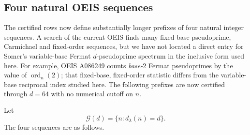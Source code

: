 \documentclass[11pt]{article}
\newcommand{\ord}{\operatorname{ord}}
\begin{document}
\subsection{Four natural OEIS sequences}
\label{subsec:oeis}

The certified rows now define substantially longer prefixes of four natural
integer sequences.  A search of the current OEIS finds many fixed-base
pseudoprime, Carmichael and fixed-order sequences, but we have not located a
direct entry for Somer's variable-base Fermat $d$-pseudoprime spectrum in the
inclusive form used here.  For example, OEIS A086249 counts \emph{base-$2$}
Fermat pseudoprimes by the value of $\ord_n(2)$; that fixed-base, fixed-order
statistic differs from the variable-base reciprocal index studied here.  The
following prefixes are now certified through $d=64$ with no numerical cutoff
on $n$.

Let
\[
\mathcal G(d)=\{n:d_\lambda(n)=d\}.
\]
The four sequences are as follows.
\end{document}

